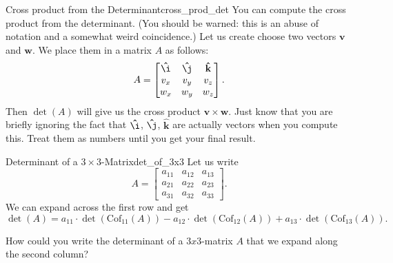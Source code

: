         \begin{ex}{Cross product from the Determinant}{cross_prod_det}
        You can compute the cross product from the determinant.  (You should be warned: this is an abuse of notation and a somewhat weird coincidence.) Let us create choose two vectors $\mathbf{v}$ and $\mathbf{w}$. We place them in a matrix $A$ as follows:
        \[
        A=
        \begin{bmatrix}
        \mathbf{\hat{\i}} & \mathbf{\hat{\j}} & \mathbf{\hat{k}}\\
        v_x & v_y & v_z\\
        w_x & w_y & w_z
        \end{bmatrix}.
        \]
        Then $\det(A)$ will give us the cross product $\mathbf{v}\times \mathbf{w}$.  Just know that you are briefly ignoring the fact that $\mathbf{\hat{\i}}$, $\mathbf{\hat{\j}}$, $\mathbf{\hat{k}}$ are actually vectors when you compute this.  Treat them as numbers until you get your final result.
        \end{ex}
        
        \begin{ex}{Determinant of a $3\times 3$-Matrix}{det_of_3x3}
        Let us write
        \[
        A=\begin{bmatrix} a_{11} & a_{12} & a_{13} \\ a_{21} & a_{22} & a_{23}\\ a_{31} & a_{32} & a_{33} \end{bmatrix}.
        \]
        We can expand across the first row and get
        \[
        \det(A)=a_{11}\cdot \det(\textrm{Cof}_{11}(A)) - a_{12}\cdot \det(\textrm{Cof}_{12}(A))+ a_{13}\cdot \det(\textrm{Cof}_{13}(A)).
        \]
        \end{ex}
        
        \begin{exercise}
        How could you write the determinant of a $3x3$-matrix $A$ that we expand along the second column?
        \end{exercise}
        
